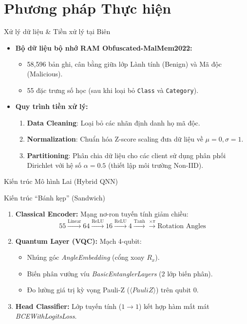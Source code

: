 \documentclass[10pt]{beamer}
\begin{document}
\section{Phương pháp Thực hiện}

\begin{frame}{Xử lý dữ liệu \& Tiền xử lý tại Biên}
    \begin{itemize}
        \item \textbf{Bộ dữ liệu bộ nhớ RAM Obfuscated-MalMem2022:}
        \begin{itemize}
            \item 58,596 bản ghi, cân bằng giữa lớp Lành tính (Benign) và Mã độc (Malicious).
            \item 55 đặc trưng số học (sau khi loại bỏ \texttt{Class} và \texttt{Category}).
        \end{itemize}
        \item \textbf{Quy trình tiền xử lý:}
        \begin{enumerate}
            \item \textbf{Data Cleaning}: Loại bỏ các nhãn định danh họ mã độc.
            \item \textbf{Normalization}: Chuẩn hóa Z-score scaling đưa dữ liệu về $\mu=0, \sigma=1$.
            \item \textbf{Partitioning}: Phân chia dữ liệu cho các client sử dụng phân phối Dirichlet với hệ số $\alpha = 0.5$ (thiết lập môi trường Non-IID).
        \end{enumerate}
    \end{itemize}
\end{frame}

\begin{frame}{Kiến trúc Mô hình Lai (Hybrid QNN)}
    \begin{block}{Kiến trúc ``Bánh kẹp'' (Sandwich)}
        \begin{enumerate}
            \item \textbf{Classical Encoder:} Mạng nơ-ron tuyến tính giảm chiều:
            $$55 \xrightarrow{\text{Linear}} 64 \xrightarrow{\text{ReLU}} 16 \xrightarrow{\text{ReLU}} 4 \xrightarrow{\text{Tanh}} \xrightarrow{\times \pi} \text{Rotation Angles}$$
            \item \textbf{Quantum Layer (VQC):} Mạch 4-qubit:
            \begin{itemize}
                \item Nhúng góc \textit{AngleEmbedding} (cổng xoay $R_x$).
                \item Biến phân vướng víu \textit{BasicEntanglerLayers} ($2$ lớp biến phân).
                \item Đo lường giá trị kỳ vọng Pauli-Z ($\langle PauliZ \rangle$) trên qubit 0.
            \end{itemize}
            \item \textbf{Head Classifier:} Lớp tuyến tính ($1 \rightarrow 1$) kết hợp hàm mất mát \textit{BCEWithLogitsLoss}.
        \end{enumerate}
    \end{block}
\end{frame}
\end{document}
